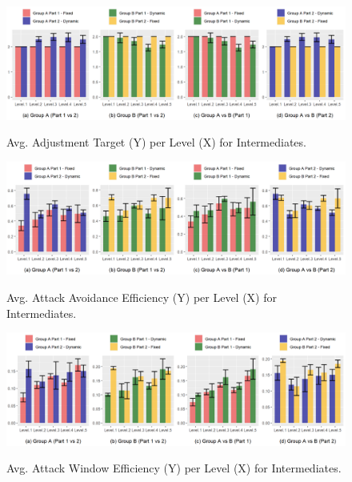 \begin{figure}[!ht]
    \begin{center}
    \caption{Avg. Adjustment Target (Y) per Level (X) for Intermediates.}
        \includegraphics[width=34em]{figures/adjustment_target_level-intermediate_players.png}
        \label{fig:result-metric-intermediate-adjustment-target-level}
    \end{center}
\end{figure}

\begin{figure}[!ht]
    \begin{center}
    \caption{Avg. Attack Avoidance Efficiency (Y) per Level (X) for Intermediates.}
        \includegraphics[width=34em]{figures/attack_avoidance_efficiency-intermediate_players.png}
        \label{fig:result-metric-intermediates-attack-avoidance-efficiency}
    \end{center}
\end{figure}

\begin{figure}[!ht]
    \begin{center}
    \caption{Avg. Attack Window Efficiency (Y) per Level (X) for Intermediates.}
        \includegraphics[width=34em]{figures/attack_window_efficiency-intermediate_players.png}
        \label{fig:result-metric-intermediates-attack-window-efficiency}
    \end{center}
\end{figure}

